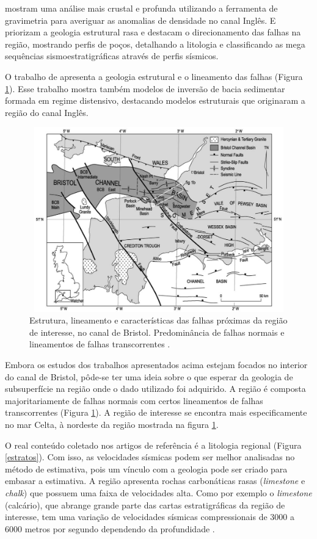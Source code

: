 \documentclass[
	12pt,				%
	openright,			%
	oneside,			%
	a4paper,			%
	english,			%
	brazil				%
	]{abntex2}
\begin{document}
	 mostram uma análise mais crustal e profunda utilizando a ferramenta de gravimetria para averiguar as anomalias de densidade no canal Inglês. E  priorizam a geologia estrutural rasa e destacam o direcionamento das falhas na região, mostrando perfis de poços, detalhando a litologia e classificando as mega sequências sismoestratigráficas através de perfis sísmicos.
	
	O trabalho de  apresenta a geologia estrutural e o lineamento das falhas (Figura \ref{falhas}). Esse trabalho mostra também modelos de inversão de bacia sedimentar formada em regime distensivo, destacando modelos estruturais que originaram a região do canal Inglês. 
	
    \begin{figure}[htp!]
		\centering
		\includegraphics[width=12cm,height=8cm]{../imagens/geologia.png}
		\caption{Estrutura, lineamento e características das falhas próximas da região de interesse, no canal de Bristol. Predominância de falhas normais e lineamentos de falhas transcorrentes \cite{glen2005basin}.}
		\label{falhas}
	\end{figure}

	Embora os estudos dos trabalhos apresentados acima estejam focados no interior do canal de Bristol, pôde-se ter uma ideia sobre o que esperar da geologia de subsuperfície na região onde o dado utilizado foi adquirido. A região é composta majoritariamente de falhas normais com certos lineamentos de falhas transcorrentes (Figura \ref{falhas}). A região de interesse se encontra mais especificamente no mar Celta, à nordeste da região mostrada na figura \ref{falhas}. 

	O real conteúdo coletado nos artigos de referência é a litologia regional (Figura \ref{estratos}). Com isso, as velocidades sísmicas podem ser melhor analisadas no método de estimativa, pois um vínculo com a geologia pode ser criado para embasar a estimativa. A região apresenta rochas carbonáticas rasas (\textit{limestone} e \textit{chalk}) que possuem uma faixa de velocidades alta. Como por exemplo o \textit{limestone} (calcário), que abrange grande parte das cartas estratigráficas da região de interesse, tem uma variação de velocidades sísmicas compressionais de 3000 a 6000 metros por segundo dependendo da profundidade \cite{mavko2020rock}.  
\end{document}
